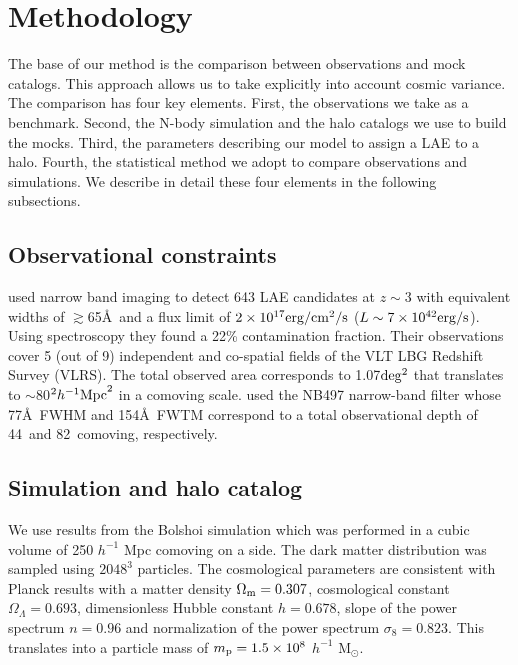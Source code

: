 \documentclass{emulateapj}
\newcommand{\hMpc}{{\ifmmode{h^{-1}{\rm Mpc}}\else{$h^{-1}$Mpc}\fi}}
\begin{document}
\section{Methodology}

The base of our method is the comparison between observations and mock
catalogs. 
This approach allows us to take explicitly into account cosmic variance. 
The comparison has four key elements. 
First, the observations we take as a benchmark. 
Second, the N-body simulation and the halo catalogs we use to build
the mocks. 
Third, the parameters describing our model to
assign a LAE to a halo. 
Fourth, the statistical method we adopt to compare observations and
simulations.  
We describe in detail these four elements in the following subsections.




\subsection{Observational constraints}
\label{subsec:obs}
\citet{Bielby16} used narrow band imaging to detect 643 LAE candidates
at $z\sim 3$  with equivalent widths of $\gtrsim$65\AA\ and a flux limit
of $2\times10^{17}{\rm erg/cm^2/s}$ ($L\sim 7\times10^{42}{\rm erg/s} $). 
Using spectroscopy they found a 22\% contamination fraction.
Their observations cover 5 (out of 9) independent and co-spatial
fields of the VLT LBG Redshift Survey (VLRS).  
The  total observed  area corresponds to 1.07$\rm deg^2$ that translates to
$\sim$80$^2\hMpc^2$ in a comoving scale. 
\citet{Bielby16} used the NB497  narrow-band filter whose 77\AA\ FWHM
and 154\AA\ FWTM correspond to a total observational depth of
44\hMpc\  and 82\hMpc\ comoving, respectively. 


\subsection{Simulation and halo catalog}
\label{subsec:sim}

We use results from the Bolshoi simulation \citep{Bolshoi,BolshoiP} which was
performed in a cubic volume of 250 $h^{-1}$ Mpc comoving on a side. 
The dark matter distribution was sampled using  $2048^{3}$
particles. 
The cosmological parameters are consistent with Planck
results \citep{Planck2014} with a matter density 
$\Omega_{\rm m} = 0.307$, cosmological constant
$\Omega_{\Lambda}=0.693$, dimensionless Hubble constant $h=0.678$, slope
of the power spectrum  $n=0.96$ and normalization of the power
spectrum $\sigma_{8}=0.823$.  
This translates into a particle mass of  $m_{\rm p}=1.5\times 10^{8}$
$h^{-1}$ M$_{\odot}$.   
\end{document}
